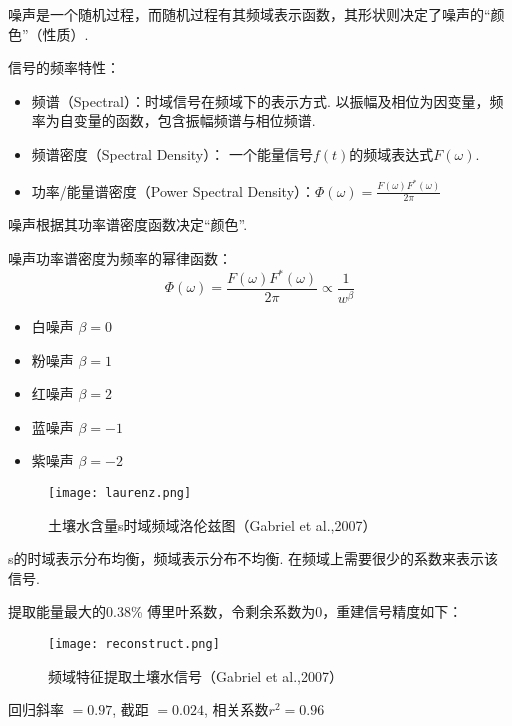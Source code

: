  
 

 
 

 
 
噪声是一个随机过程，而随机过程有其频域表示函数，其形状则决定了噪声的``颜色''（性质）.

信号的频率特性：
\begin{itemize}
\item {频谱（Spectral）}：时域信号在频域下的表示方式. 以振幅及相位为因变量，频率为自变量的函数，包含振幅频谱与相位频谱.
\item {频谱密度（Spectral Density）}： 一个能量信号$f(t)$的频域表达式$F(\omega)$.
\item  {功率/能量谱密度（Power Spectral Density）}：$\Phi(\omega)=\frac{F(\omega)F^*(\omega)}{2\pi}$
\end{itemize}
噪声根据其功率谱密度函数决定``颜色''.
 

 
 
噪声功率谱密度为频率的幂律函数：
\begin{equation*}
\Phi(\omega)=\frac{F(\omega)F^*(\omega)}{2\pi} \propto \frac{1}{w^\beta}
\end{equation*}
\begin{itemize}
\item  {白噪声} $\beta=0$
\item 粉噪声 $\beta=1$
\item  {红噪声} $\beta=2$
\item 蓝噪声 $\beta=-1$
\item 紫噪声 $\beta=-2$
\end{itemize}
 
 

 
 
\begin{figure}[H]
\centering
\texttt{[image: laurenz.png]}
\caption{土壤水含量s时域频域洛伦兹图（Gabriel et al.,2007）}
\end{figure} 
s的时域表示分布均衡，频域表示分布不均衡. 在频域上需要很少的系数来表示该信号.
 

 
 
提取能量最大的0.38\% 傅里叶系数，令剩余系数为0，重建信号精度如下：
\begin{figure}[H]
\centering
\texttt{[image: reconstruct.png]}
\caption{频域特征提取土壤水信号（Gabriel et al.,2007）}
\label{laurenz}
\end{figure} 
回归斜率 $=0.97$, 截距 $= 0.024$, 相关系数$r^2
=0.96$















